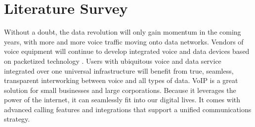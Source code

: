 \chapter{Literature Survey}
\justify
\quad
Without a doubt, the data revolution will only gain momentum in the coming years, with more and more voice traffic moving onto data networks. Vendors of voice equipment will continue to develop integrated voice and data devices based on packetized technology . Users with ubiquitous voice and data service integrated over one universal infrastructure will benefit from true, seamless, transparent interworking between voice and all types of data. VoIP is a great solution for small businesses and large corporations. Because it leverages the power of the internet, it can seamlessly fit into our digital lives. It comes with advanced calling features and integrations that support a unified communications strategy.


\newpage
